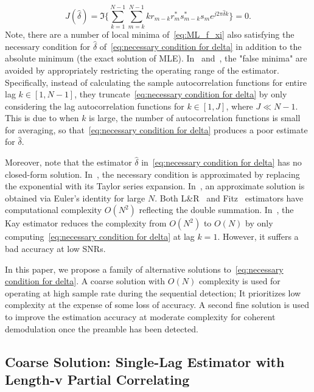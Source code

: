 \begin{equation}
    \label{eq:necessary condition for delta}
    J(\hat{\delta}) = \Im\bigg\{\sum_{k=1}^{N-1}{\sum_{m=k}^{N-1}{kr_{m-k}r_m^{*}s_{m-k}^{*}s_m}e^{j2\pi\hat{\delta}k}}\bigg\}=0.
    \end{equation}
Note, there are a number of local minima of~\eqref{eq:ML_f_xi} also satisfying
the necessary condition for $\hat{\delta}$ of~\eqref{eq:necessary condition for delta} in addition to the absolute minimum
(the exact solution of MLE). In~\cite{Luise_Reggiannini_95} and~\cite{Fitz_94}, the "false minima" are avoided
by appropriately restricting the operating range of the estimator. Specifically,
instead of calculating the sample autocorrelation functions for entire lag $k\in[1,N-1]$, 
they truncate~\eqref{eq:necessary condition for delta} by only considering the lag autocorrelation functions for $k\in[1,J]$,
where $J \ll N{-}1$. This is due to when $k$ is large, the number of autocorrelation functions is small for averaging,
so that~\eqref{eq:necessary condition for delta} produces a poor estimate for $\hat{\delta}$. 

Moreover, note that the estimator $\hat{\delta}$ in~\eqref{eq:necessary condition for delta} has no closed-form solution.
In~\cite{Luise_Reggiannini_95}, the necessary condition is approximated by replacing the exponential with its Taylor series expansion.
In~\cite{Fitz_94}, an approximate solution is obtained via Euler's identity for large $N$.
Both L\&R~\cite{Luise_Reggiannini_95} and Fitz~\cite{Fitz_94} estimators have computational complexity $O(N^2)$ 
reflecting the double summation. In~\cite{kay_89}, the Kay estimator reduces the complexity from $O(N^2)$ to $O(N)$ by only computing~\eqref{eq:necessary condition for delta} at lag $k=1$.
However, it suffers a bad accuracy at low SNRs.

In this paper, we propose a family of alternative solutions to~\eqref{eq:necessary condition for delta}.
A coarse solution with $O(N)$ complexity is used for operating at high sample rate during the sequential detection;
It prioritizes low complexity at the expense of some loss of accuracy. A second fine solution is used to improve
the estimation accuracy at moderate complexity for coherent demodulation once the preamble has been detected. 

\subsection{Coarse Solution: Single-Lag Estimator with Length-v Partial Correlating}

